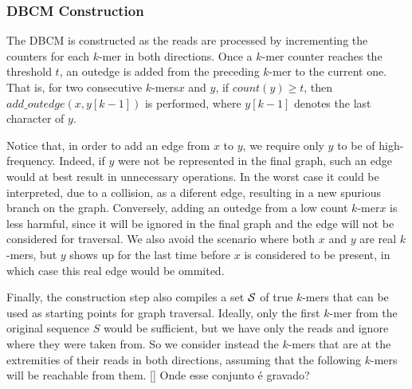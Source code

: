 \documentclass[a4paper,12pt]{article}
\newcommand{\dBCM}{DBCM\xspace}
\newcommand{\kmer}{\mbox{$k$-mer}\xspace}
\newcommand{\kmers}{\mbox{$k$-mers}\xspace}
\newcommand{\strsetname}[1]{\ensuremath{\mathcal{\uppercase{#1}}}}
\newcommand{\todo}[2][]{\color{red} [#1] #2 \color{black}}
\begin{document}

\subsubsection{\dBCM Construction}
\label{subsubsec:dbcm-construction}

The \dBCM is constructed as the reads are processed by incrementing the counters for each \kmer in both directions. Once a \kmer counter reaches the threshold $t$, an outedge is added from the preceding \kmer to the current one. That is, for two consecutive \kmers $x$ and $y$, if $\mathit{count}(y) \geq t$, then $\mathit{add\_outedge}(x, y[k-1])$ is performed, where $y[k-1]$ denotes the last character of $y$. 

Notice that, in order to add an edge from $x$ to $y$, we require only $y$ to be of high-frequency. Indeed, if $y$ were not be represented in the final graph, such an edge would at best result in unnecessary operations. In the worst case it could be interpreted, due to a collision, as a diferent edge, resulting in a new spurious branch on the graph. Conversely, adding an outedge from a low count \kmer $x$ is less harmful, since it will be ignored in the final graph and the edge will not be considered for traversal. We also avoid the scenario where both $x$ and $y$ are real \kmers, but $y$ shows up for the last time before $x$ is considered to be present, in which case this real edge would be ommited. 

Finally, the construction step also compiles a set $\strsetname{S}$ of true \kmers that can be used as starting points for graph traversal. 
Ideally, only the first \kmer from the original sequence $S$ would be sufficient, but we have only the reads and ignore where they were taken from. So we consider instead the \kmers that are at the extremities of their reads in both directions, assuming that the following \kmers will be reachable from them.
\todo{Onde esse conjunto é gravado?}

\end{document}
